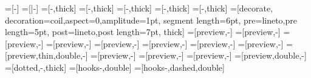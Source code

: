\usetikzlibrary{decorations,decorations.pathmorphing}
=[-\@mmtarrowtip] 
=[|-\@mmtarrowtip] %
=[-\@mmtarrowtip,thick]
=[\@mmtarrowtipmonoright-\@mmtarrowtip,thick]
=[\@mmtarrowtipmonoright-\@mmtarrowtippartial,thick]
=[\@mmtarrowtipmonoleft-\@mmtarrowtip,thick]
=[\@mmtarrowtipmonoleft-\@mmtarrowtippartialleft,thick]
=[decorate,
                                decoration={coil,aspect=0,amplitude=1pt,
                                                    segment length=6pt,
                                                    pre=lineto,pre length=5pt,
                                                    post=lineto,post length=7pt},
                                thick]
=[preview,-\@mmtarrowtip]
=[preview,\@mmtarrowtipmonoright-\@mmtarrowtip]
=[preview,-\@mmtarrowtippartial]
=[preview,\@mmtarrowtipmonoright-\@mmtarrowtippartial]
=[preview,-\@mmtarrowtip]
=[preview,\@mmtarrowtipmonoleft-\@mmtarrowtip]
=[preview,-\@mmtarrowtippartialleft]
=[preview,\@mmtarrowtipmonoleft-\@mmtarrowtippartialleft]
=[preview,thin,double,-\@mmtarrowtip]
=[preview,\@mmtreversearrowtip-\@mmtarrowtip]
=[preview,\@mmtreversearrowtippartial-\@mmtarrowtippartial]
=[preview,\@mmtreversearrowtippartialleft-\@mmtarrowtippartialleft]
=[preview,double,-\@mmtarrowtip]
=[dotted,-\@mmtarrowtip,thick]
=[hooks-\@mmtarrowtip,double] 
=[hooks-\@mmtarrowtip,dashed,double] 

\newcommand\mmtthy[3]{\def\@test{#3}%
\begin{array}{l}\textsf{#1}\\\hline #2\ifx\@test\@empty\else\\\hline #3\fi\end{array}}
\newcommand\mmtar[2][]{\raisebox{.5ex}{\tikz[#1]{\draw[#2] (0,0) -- (.6,0);}}}
\newcommand\nmmtar[3][]{\raisebox{.4ex}{\tikz[#1]{\draw[#2] (0,0) --
      node[above]{\ensuremath{\scriptstyle #3}} (.8,0);}}}

